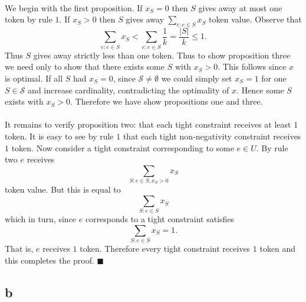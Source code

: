 \documentclass[letterpaper,12pt,oneside,onecolumn]{article}
\newcommand{\cS}{\mathcal{S}} \newcommand{\cT}{\mathcal{T}}
\begin{document}
\paragraph{}
We begin with the first proposition. If $x_S = 0$ then $S$ gives away at most one token by rule $1$. If $x_S > 0$ then $S$ gives away $\sum_{e: e\in S} x_S$ token value. Observe that
$$\sum_{e: e\in S} x_S < \sum_{e: e\in S} \frac{1}{k} = \frac{|S|}{k} \leq 1.$$
Thus $S$ gives away strictly less than one token. Thus to show proposition three we need only to show that there exists some $S$ with $x_S > 0$. This follows since $x$ is optimal. If all $S$ had $x_S = 0$, since $\cS \neq\emptyset$ we could simply set $x_S = 1$ for one $S \in \cS$ and increase cardinality, contradicting the optimality of $x$. Hence some $S$ exists with $x_S > 0$. Therefore we have show propositions one and three.
\paragraph{}
It remains to verify proposition two: that each tight constraint receives at least $1$ token. It is easy to see by rule $1$ that each tight non-negativity constraint receives $1$ token. Now consider a tight constraint corresponding to some $e \in U$. By rule two $e$ receives
$$\sum_{S : e\in S, x_S > 0} x_S$$
token value. But this is equal to
$$\sum_{S: e\in S} x_S$$
which in turn, since $e$ corresponds to a tight constraint satisfies
$$\sum_{S: e\in S} x_S = 1.$$
That is, $e$ receives $1$ token. Therefore every tight constraint receives $1$ token and this completes the proof. $\blacksquare$
\subsection*{b}
\end{document}
